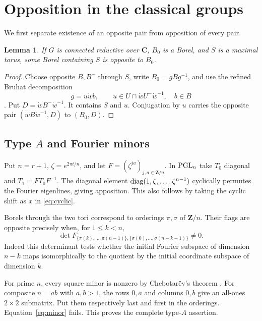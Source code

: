 \documentclass[11pt]{article}
\newcommand{\C}{\mathbf C}\newcommand{\Z}{\mathbf Z}\newcommand{\Q}{\mathbf Q}
\newtheorem{lemma}[theorem]{Lemma}
\theoremstyle{definition}\newtheorem{definition}[theorem]{Definition}
\theoremstyle{remark}\newtheorem{remark}[theorem]{Remark}
\begin{document}
\section{Opposition in the classical groups}\label{sec:classical}
We first separate existence of an opposite pair from opposition of every pair.
\begin{lemma}\label{lem:some}
If $G$ is connected reductive over $\C$, $B_0$ is a Borel, and $S$ is a maximal torus, some Borel containing $S$ is opposite to $B_0$.
\end{lemma}
\begin{proof}
Choose opposite $B,B^-$ through $S$, write $B_0=gBg^{-1}$, and use the refined Bruhat decomposition
\[
 g=u\dot w b,\qquad u\in U\cap\dot wU^-\dot w^{-1},\quad b\in B
\]
\citep[\S2.4, p.~52]{Steinberg1965}. Put $D=\dot wB^-\dot w^{-1}$. It contains $S$ and $u$. Conjugation by $u$ carries the opposite pair $(\dot wB\dot w^{-1},D)$ to $(B_0,D)$.
\end{proof}

\subsection{Type \texorpdfstring{$A$}{A} and Fourier minors}
Put $n=r+1$, $\zeta=e^{2\pi i/n}$, and let $F=(\zeta^{ja})_{j,a\in\Z/n}$. In $\operatorname{PGL}_n$ take $T_0$ diagonal and $T_1=FT_0F^{-1}$. The diagonal element $\operatorname{diag}(1,\zeta,\ldots,\zeta^{n-1})$ cyclically permutes the Fourier eigenlines, giving apposition. This also follows by taking the cyclic shift as $x$ in \eqref{eq:cyclic}.

Borels through the two tori correspond to orderings $\pi,\sigma$ of $\Z/n$. Their flags are opposite precisely when, for $1\leq k<n$,
\begin{equation}\label{eq:minor}
 \det F_{\{\pi(k),\ldots,\pi(n-1)\},\{\sigma(0),\ldots,\sigma(n-k-1)\}}\ne0.
\end{equation}
Indeed this determinant tests whether the initial Fourier subspace of dimension $n-k$ maps isomorphically to the quotient by the initial coordinate subspace of dimension $k$.

For prime $n$, every square minor is nonzero by Chebotar\"ev's theorem \citep[Lemma~1.3, p.~123; author-version proof, pp.~3--4]{Tao2005}. For composite $n=ab$ with $a,b>1$, the rows $0,a$ and columns $0,b$ give an all-ones $2\times2$ submatrix. Put them respectively last and first in the orderings. Equation~\eqref{eq:minor} fails. This proves the complete type-$A$ assertion.
\end{document}
